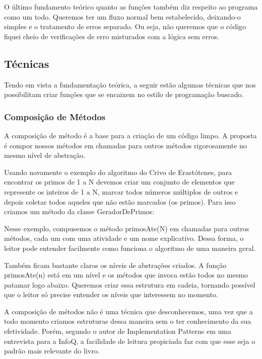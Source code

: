 O último fundamento teórico quanto as funções também diz respeito ao programa como um todo. Queremos ter um fluxo normal bem estabelecido, deixando-o simples e o tratamento de erros separado. Ou seja, não queremos que o código fiquei cheio de verificações de erro misturados com a lógica sem erros.
	
\subsection{Técnicas}
Tendo em vista a fundamentação teórica, a seguir estão algumas técnicas que nos possibilitam criar funções que se encaixem no estilo de programação buscado.

\subsubsection{Composição de Métodos}
A composição de método é a base para a criação de um código limpo. A proposta é compor nossos métodos em chamadas para outros métodos rigorosamente no mesmo nível de abstração.
	
Usando novamente o exemplo do algoritmo do Crivo de Erastótenes, para encontrar os primos de 1 a N devemos criar um conjunto de elementos que represente os inteiros de 1 a N, marcar todos números múltiplos de outros e depois coletar todos aqueles que não estão marcados (os primos). Para isso criamos um método da classe GeradorDePrimos:



Nesse exemplo, compusemos o método primosAte(N) em chamadas para outros métodos, cada um com uma atividade e um nome explicativo. Dessa forma, o leitor pode entender facilmente como funciona o algoritmo de uma maneira geral. 
	
Também ficam bastante claros os níveis de abstrações criados. A função primosAte(n) está em um nível e os métodos que invoca estão todos no mesmo patamar logo abaixo. Queremos criar essa estrutura em cadeia, tornando possível que o leitor só precise entender os níveis que interessem no momento.
	
A composição de métodos não é uma técnica que desconhecemos, uma vez que a todo momento criamos estruturas dessa maneira sem o ter conhecimento da sua efetividade. Porém, segundo o autor de Implementation Patterns em uma entrevista para a InfoQ, a facilidade de leitura propiciada faz com que esse seja o padrão mais relevante do livro. 	

